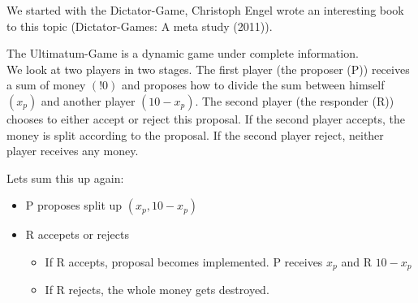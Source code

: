 
We started with the Dictator-Game, Christoph Engel wrote an interesting book to this topic (Dictator-Games: A meta study (2011)).

\begin{example}	
The Ultimatum-Game is a dynamic game under complete information. \\
We look at two players in two stages. The first player (the proposer (P)) receives a sum of money $(!0)$ and proposes how to divide the sum between himself $(x_{p})$ and another player $(10 - x_{p})$. The second player (the responder (R)) chooses to either accept or reject this proposal. If the second player accepts, the money is split according to the proposal. If the second player reject, neither player receives any money.

Lets sum this up again:
	\begin{itemize}
		\item P proposes split up $(x_{p}, 10 - x_{p})$
		\item R accepets or rejects
			\begin{itemize}
				\item If R accepts, proposal becomes implemented. P receives $x_{p}$ and R $10 - x_{p}$
				\item If R rejects, the whole money gets destroyed.
			\end{itemize}
	\end{itemize}
\end{example}

\newpage